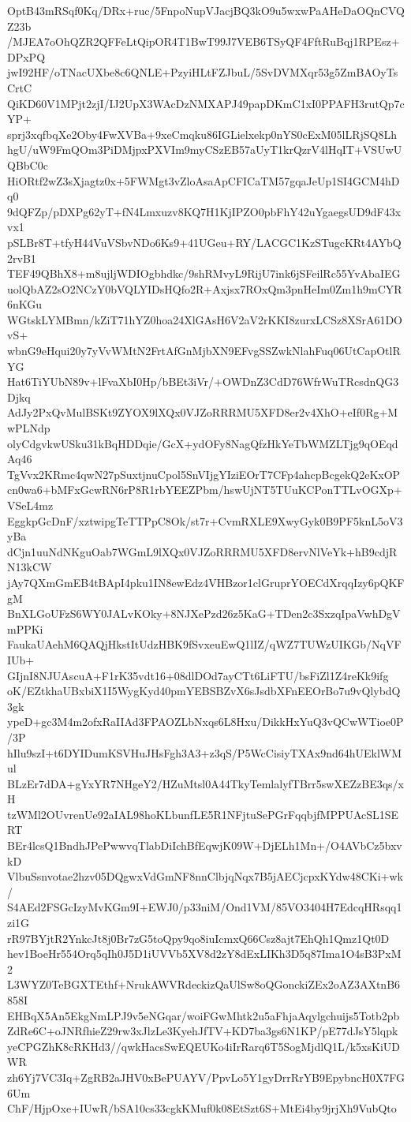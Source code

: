 OptB43mRSqf0Kq/DRx+ruc/5FnpoNupVJacjBQ3kO9u5wxwPaAHeDaOQnCVQZ23b
/MJEA7oOhQZR2QFFeLtQipOR4T1BwT99J7VEB6TSyQF4FftRuBqj1RPEsz+DPxPQ
jwI92HF/oTNacUXbe8c6QNLE+PzyiHLtFZJbuL/5SvDVMXqr53g5ZmBAOyTsCrtC
QiKD60V1MPjt2zjI/IJ2UpX3WAcDzNMXAPJ49papDKmC1xI0PPAFH3rutQp7cYP+
sprj3xqfbqXe2Oby4FwXVBa+9xeCmqku86IGLielxekp0nYS0cExM05lLRjSQ8Lh
hgU/uW9FmQOm3PiDMjpxPXVIm9myCSzEB57aUyT1krQzrV4lHqIT+VSUwUQBbC0c
HiORtf2wZ3sXjagtz0x+5FWMgt3vZloAsaApCFICaTM57gqaJeUp1SI4GCM4hDq0
9dQFZp/pDXPg62yT+fN4Lmxuzv8KQ7H1KjIPZO0pbFhY42uYgaegsUD9dF43xvx1
pSLBr8T+tfyH44VuVSbvNDo6Ks9+41UGeu+RY/LACGC1KzSTugcKRt4AYbQ2rvB1
TEF49QBhX8+m8ujljWDIOgbhdkc/9shRMvyL9RijU7ink6jSFeilRc55YvAbaIEG
uolQbAZ2sO2NCzY0bVQLYIDsHQfo2R+Axjsx7ROxQm3pnHeIm0Zm1h9mCYR6nKGu
WGtskLYMBmn/kZiT71hYZ0hoa24XlGAsH6V2aV2rKKI8zurxLCSz8XSrA61DOvS+
wbnG9eHqui20y7yVvWMtN2FrtAfGnMjbXN9EFvgSSZwkNlahFuq06UtCapOtlRYG
Hat6TiYUbN89v+lFvaXbI0Hp/bBEt3iVr/+OWDnZ3CdD76WfrWuTRcsdnQG3Djkq
AdJy2PxQvMulBSKt9ZYOX9lXQx0VJZoRRRMU5XFD8er2v4XhO+eIf0Rg+MwPLNdp
olyCdgvkwUSku31kBqHDDqie/GcX+ydOFy8NagQfzHkYeTbWMZLTjg9qOEqdAq46
TgVvx2KRmc4qwN27pSuxtjnuCpol5SnVIjgYIziEOrT7CFp4ahcpBcgekQ2eKxOP
cn0wa6+bMFxGcwRN6rP8R1rbYEEZPbm/hswUjNT5TUuKCPonTTLvOGXp+VSeL4mz
EggkpGcDnF/xztwipgTeTTPpC8Ok/st7r+CvmRXLE9XwyGyk0B9PF5knL5oV3yBa
dCjn1uuNdNKguOab7WGmL9lXQx0VJZoRRRMU5XFD8ervNlVeYk+hB9cdjRN13kCW
jAy7QXmGmEB4tBApI4pku1IN8ewEdz4VHBzor1clGruprYOECdXrqqIzy6pQKFgM
BnXLGoUFzS6WY0JALvKOky+8NJXePzd26z5KaG+TDen2c3SxzqIpaVwhDgVmPPKi
FaukaUAehM6QAQjHkstItUdzHBK9fSvxeuEwQ1lIZ/qWZ7TUWzUIKGb/NqVFIUb+
GIjnI8NJUAscuA+F1rK35vdt16+08dlDOd7ayCTt6LiFTU/bsFiZl1Z4reKk9ifg
oK/EZtkhaUBxbiX1I5WygKyd40pmYEBSBZvX6sJsdbXFnEEOrBo7u9vQlybdQ3gk
ypeD+gc3M4m2ofxRaIIAd3FPAOZLbNxqs6L8Hxu/DikkHxYuQ3vQCwWTioe0P/3P
hIlu9szI+t6DYIDumKSVHuJHsFgh3A3+z3qS/P5WcCisiyTXAx9nd64hUEklWMul
BLzEr7dDA+gYxYR7NHgeY2/HZuMtsl0A44TkyTemlalyfTBrr5swXEZzBE3qs/xH
tzWMl2OUvrenUe92aIAL98hoKLbunfLE5R1NFjtuSePGrFqqbjfMPPUAcSL1SERT
BEr4lcsQ1BndhJPePwwvqTlabDiIchBfEqwjK09W+DjELh1Mn+/O4AVbCz5bxvkD
VlbuSsnvotae2hzv05DQgwxVdGmNF8nnClbjqNqx7B5jAECjcpxKYdw48CKi+wk/
S4AEd2FSGcIzyMvKGm9I+EWJ0/p33niM/Ond1VM/85VO3404H7EdcqHRsqq1zi1G
rR97BYjtR2YnkcJt8j0Br7zG5toQpy9qo8iuIcmxQ66Csz8ajt7EhQh1Qmz1Qt0D
hev1BoeHr554Orq5qIh0J5D1iUVVb5XV8d2zY8dExLIKh3D5q87Ima1O4sB3PxM2
L3WYZ0TeBGXTEthf+NrukAWVRdeckizQaUlSw8oQGonckiZEx2oAZ3AXtnB6858I
EHBqX5An5EkgNmLPJ9v5eNGqar/woiFGwMhtk2u5aFhjaAqylgchuijs5Totb2pb
ZdRe6C+oJNRfhieZ29rw3xJlzLe3KyehJfTV+KD7ba3gs6N1KP/pE77dJsY5lqpk
yeCPGZhK8cRKHd3//qwkHacsSwEQEUKo4iIrRarq6T5SogMjdlQ1L/k5xsKiUDWR
zh6Yj7VC3Iq+ZgRB2aJHV0xBePUAYV/PpvLo5Y1gyDrrRrYB9EpybncH0X7FG6Um
ChF/HjpOxe+IUwR/bSA10cs33cgkKMuf0k08EtSzt6S+MtEi4by9jrjXh9VubQto
